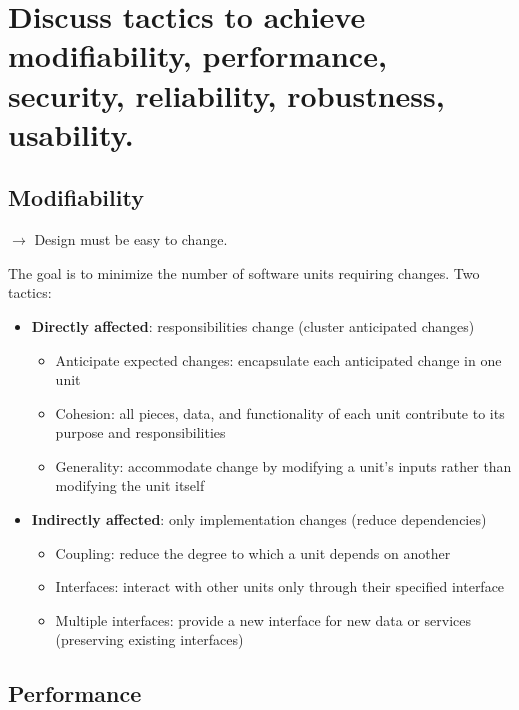 \clearpage{}
\section{Discuss tactics to achieve modifiability, performance, security,
reliability, robustness, usability.}

\subsection{Modifiability}

$\rightarrow$ Design must be easy to change.

The goal is to minimize the number of software units requiring changes.
Two tactics:
\begin{itemize}

    \item \textbf{Directly affected}: responsibilities change (cluster
        anticipated changes)

        \begin{itemize}
            \item Anticipate expected changes: encapsulate each anticipated change in one unit
            \item Cohesion: all pieces, data, and functionality of each unit contribute to its purpose
                and responsibilities
            \item Generality: accommodate change by modifying a unit's inputs rather than modifying
                the unit itself
        \end{itemize}

    \item \textbf{Indirectly affected}: only implementation changes
        (reduce dependencies)

        \begin{itemize}
            \item Coupling: reduce the degree to which a unit depends on another
            \item Interfaces: interact with other units only through their specified interface
            \item Multiple interfaces: provide a new interface for new data or services (preserving
                existing interfaces)
        \end{itemize}
\end{itemize}


\subsection{Performance}

